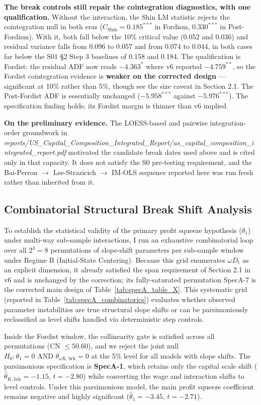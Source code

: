 \documentclass[11pt,a4paper]{article}
\begin{document}
\textbf{The break controls still repair the cointegration diagnostics, with one qualification.} Without the interaction, the Shin LM statistic rejects the cointegration null in both eras ($C_{\text{Shin}} = 0.185^{***}$ in Fordism, $0.330^{***}$ in Post-Fordism). With it, both fall below the 10\% critical value (0.052 and 0.036) and residual variance falls from 0.096 to 0.057 and from 0.074 to 0.044, in both cases far below the S01 \S2 Step 3 baselines of 0.158 and 0.184. The qualification is Fordist: the residual ADF now reads $-4.363^{*}$ where v6 reported $-4.759^{**}$, so the Fordist cointegration evidence is \textbf{weaker on the corrected design} --- significant at 10\% rather than 5\%, though see the size caveat in Section 2.1. The Post-Fordist ADF is essentially unchanged ($-5.958^{***}$ against $-5.976^{***}$). The specification finding holds; its Fordist margin is thinner than v6 implied.

\textbf{On the preliminary evidence.} The LOESS-based and pairwise integration-order groundwork in \textit{reports/US\_Capital\_Composition\_Integrated\_Report/us\_capital\_composition\_integrated\_report.pdf} motivated the candidate break dates used above and is cited only in that capacity. It does not satisfy the S0\* pre-testing requirement, and the Bai-Perron $\to$ Lee-Strazicich $\to$ IM-OLS sequence reported here was run fresh rather than inherited from it.

\subsection{Combinatorial Structural Break Shift Analysis}

To establish the statistical validity of the primary profit squeeze hypothesis ($\theta_1$) under multi-way sub-sample interactions, I run an exhaustive combinatorial loop over all $2^3 = 8$ permutations of slope-shift parameters per sub-sample window under Regime B (Initial-State Centering). Because this grid enumerates $\omega D_t$ as an explicit dimension, it already satisfied the span requirement of Section 2.1 in v6 and is unchanged by the correction; its fully-saturated permutation SpecA-7 is the corrected main design of Table~\ref{tab:specA_table_X}. This systematic grid (reported in Table~\ref{tab:specA_combinatorics}) evaluates whether observed parameter instabilities are true structural slope shifts or can be parsimoniously reclassified as level shifts handled via deterministic step controls.

Inside the Fordist window, the collinearity gate is satisfied across all permutations (CN $\le 50.60$), and we reject the joint null $H_0: \theta_1 = 0 \text{ AND } \theta_{\omega K, \text{brk}} = 0$ at the 5\% level for all models with slope shifts. The parsimonious specification is \textbf{SpecA-1}, which retains only the capital scale shift ($\hat{\theta}_{K,\text{brk}} = -1.15$, $t = -2.80$) while converting the wage and interaction shifts to level controls. Under this parsimonious model, the main profit squeeze coefficient remains negative and highly significant ($\hat{\theta}_1 = -3.45$, $t = -2.71$).
\end{document}

